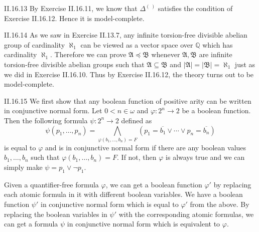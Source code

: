 \documentclass[12pt]{article}
\begin{document}
\begin{customthm}{II.16.13}
  By Exercise II.16.11, we know that $\Delta^{(~)}$ satisfies the condition of Exercise II.16.12. Hence it is model-complete.
\end{customthm}

\begin{customthm}{II.16.14}
  As we saw in Exercise II.13.7, any infinite torsion-free divisible abelian group of cardinality $\aleph_1$ can be viewed as a vector space over $\mathbb{Q}$ which has cardinality $\aleph_1$. Therefore we can prove $\mathfrak{A}\preccurlyeq\mathfrak{B}$ whenever $\mathfrak{A},\mathfrak{B}$ are infinite torsion-free divisible abelian groups such that $\mathfrak{A}\subseteq\mathfrak{B}$ and $|\mathfrak{A}|=|\mathfrak{B}|=\aleph_1$ just as we did in Exercise II.16.10. Thus by Exercise II.16.12, the theory turns out to be model-complete.
\end{customthm}

\begin{customthm}{II.16.15}
  We first show that any boolean function of positive arity can be written in conjunctive normal form. Let $0<n\in\omega$ and $\varphi:2^n\rightarrow 2$ be a boolean function. Then the following formula $\psi:2^n\rightarrow 2$ defined as
  \[
    \psi(p_1,\ldots,p_n)=\bigwedge_{\varphi(b_1,\ldots,b_n)=F}(p_1=\overline{b_1}\vee\cdots\vee p_n=\overline{b_n})
  \]
  is equal to $\varphi$ and is in conjunctive normal form if there are any boolean values $b_1,\ldots,b_n$ such that $\varphi(b_1,\ldots,b_n)=F$. If not, then $\varphi$ is always true and we can simply make $\psi=p_1\vee\neg p_1$.

  Given a quantifier-free formula $\varphi$, we can get a boolean function $\varphi'$ by replacing each atomic formula in it with different boolean variables. We have a boolean function $\psi'$ in conjunctive normal form which is equal to $\varphi'$ from the above. By replacing the boolean variables in $\psi'$ with the corresponding atomic formulas, we can get a formula $\psi$ in conjunctive normal form which is equivalent to $\varphi$.
\end{customthm}
\end{document}
